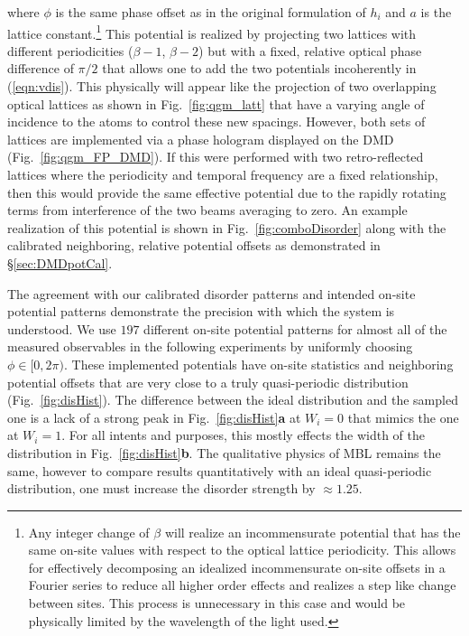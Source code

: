 where $\phi$ is the same phase offset as in the original formulation of $h_i$ and $a$ is the lattice constant.\footnote{Any integer change of $\beta$ will realize an incommensurate potential that has the same on-site values with respect to the optical lattice periodicity. This allows for effectively decomposing an idealized incommensurate on-site offsets in a Fourier series to reduce all higher order effects and realizes a step like change between sites. This process is unnecessary in this case and would be physically limited by the wavelength of the light used.} This potential is realized by projecting two lattices with different periodicities ($\beta-1$, $\beta-2$) but with a fixed, relative optical phase difference of $\pi/2$ that allows one to add the two potentials incoherently in (\ref{eqn:vdis}). This physically will appear like the projection of two overlapping optical lattices as shown in Fig.~\ref{fig:qgm_latt} that have a varying angle of incidence to the atoms to control these new spacings. However, both sets of lattices are implemented via a phase hologram displayed on the DMD (Fig.~\ref{fig:qgm_FP_DMD}). If this were performed with two retro-reflected lattices where the periodicity and temporal frequency are a fixed relationship, then this would provide the same effective potential due to the rapidly rotating terms from interference of the two beams averaging to zero. An example realization of this potential is shown in Fig.~\ref{fig:comboDisorder} along with the calibrated neighboring, relative potential offsets as demonstrated in \S \ref{sec:DMDpotCal}.

The agreement with our calibrated disorder patterns and intended on-site potential patterns demonstrate the precision with which the system is understood. We use $197$ different on-site potential patterns for almost all of the measured observables in the following experiments by uniformly choosing $\phi \in [0,2 \pi)$. These implemented potentials have on-site statistics and neighboring potential offsets that are very close to a truly quasi-periodic distribution (Fig.~\ref{fig:disHist}). The difference between the ideal distribution and the sampled one is a lack of a strong peak in Fig.~\ref{fig:disHist}\textbf{a} at $W_i=0$ that mimics the one at $W_i=1$. For all intents and purposes, this mostly effects the width of the distribution in Fig.~\ref{fig:disHist}\textbf{b}. The qualitative physics of MBL remains the same, however to compare results quantitatively with an ideal quasi-periodic distribution, one must increase the disorder strength by $\approx 1.25$.

